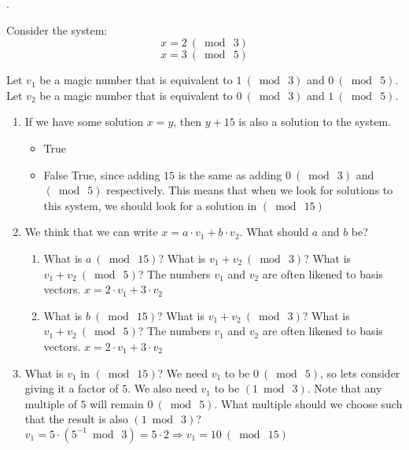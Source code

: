 \documentclass[11pt, preview]{standalone} %
\begin{document}
.

Consider the system:
$$x = 2 \ (\bmod \ 3)$$
$$x = 3 \ (\bmod \ 5)$$

Let $v_1$ be a magic number that is equivalent to $1 \ (\bmod \ 3)$ and  $0 \ (\bmod \ 5)$.
Let $v_2$ be a magic number that is equivalent to $0 \ (\bmod \ 3)$ and $1 \ (\bmod \ 5)$.

\begin{enumerate}
\item If we have some solution $x=y$, then $y+15$ is also a solution to the system.
	\begin{Choices} 
	\begin{itemize}
	\TrueChoice\item True
	\FalseChoice\item False
	\Solution True, since adding $15$ is the same as adding $0 \ (\bmod \ 3)$ and $(\bmod \ 5)$ respectively. This means that when we look for solutions to this system, we should look for a solution in $(\bmod \ 15)$
	\end{itemize}
	\end{Choices}
\item 
	We think that we can write $x= a \cdot v_1 + b \cdot v_2$. What should $a$ and $b$ be?
	\begin{enumerate}
		\item \begin{Freeform}{2}
			What is $a \ (\bmod \ 15)$?
			\Hint What is $v_1 + v_2 \ (\bmod \ 3)$? What is $v_1 + v_2 \ (\bmod \ 5)$? The numbers $v_1$ and $v_2$ are often likened to basis vectors.
			\Solution $x = 2 \cdot v_1+3 \cdot v_2$
			\end{Freeform}
		\item \begin{Freeform}{3}
			What is $b \ (\bmod \ 15)$?
			\Hint What is $v_1 + v_2 \ (\bmod \ 3)$? What is $v_1 + v_2 \ (\bmod \ 5)$? The numbers $v_1$ and $v_2$ are often likened to basis vectors.
			\Solution $x = 2 \cdot v_1+3 \cdot v_2$
			\end{Freeform}
	\end{enumerate}

\item \begin{Freeform}{10}
	What is $v_1$ in $(\bmod \ 15)$? 
	\Hint We need $v_1$ to be $0 \ (\bmod \ 5)$, so lets consider giving it a factor of $5$. We also need $v_1$ to be $(1 \bmod \ 3)$. Note that any multiple of $5$ will remain $0 \ (\bmod \ 5)$. What multiple should we choose such that the result is also $(1 \bmod \ 3)$?
	\Solution $v_1 = 5 \cdot (5^{-1} \bmod \ 3) = 5 \cdot 2 \Rightarrow v_1 = 10 \ (\bmod \ 15)$
	\end{Freeform}


\end{enumerate}
\end{document}
